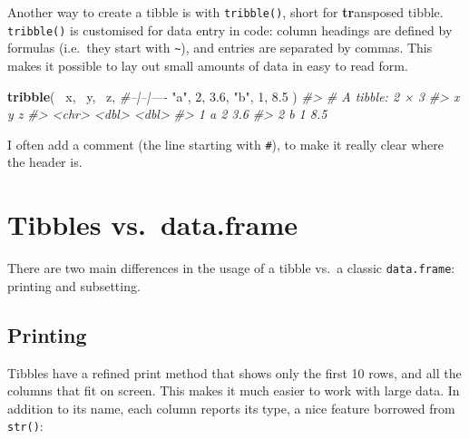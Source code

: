 \documentclass[]{book}
\newenvironment{Shaded}{\begin{snugshade}}{\end{snugshade}}
\newcommand{\KeywordTok}[1]{\textcolor[rgb]{0.13,0.29,0.53}{\textbf{{#1}}}}
\newcommand{\DecValTok}[1]{\textcolor[rgb]{0.00,0.00,0.81}{{#1}}}
\newcommand{\FloatTok}[1]{\textcolor[rgb]{0.00,0.00,0.81}{{#1}}}
\newcommand{\StringTok}[1]{\textcolor[rgb]{0.31,0.60,0.02}{{#1}}}
\newcommand{\CommentTok}[1]{\textcolor[rgb]{0.56,0.35,0.01}{\textit{{#1}}}}
\newcommand{\NormalTok}[1]{{#1}}
\begin{document}
Another way to create a tibble is with \texttt{tribble()}, short for
\textbf{tr}ansposed tibble. \texttt{tribble()} is customised for data
entry in code: column headings are defined by formulas (i.e.~they start
with \texttt{\textasciitilde{}}), and entries are separated by commas.
This makes it possible to lay out small amounts of data in easy to read
form.

\begin{Shaded}
\begin{Highlighting}[]
\KeywordTok{tribble}\NormalTok{(}
  \NormalTok{~x, ~y, ~z,}
  \CommentTok{#--|--|----}
  \StringTok{"a"}\NormalTok{, }\DecValTok{2}\NormalTok{, }\FloatTok{3.6}\NormalTok{,}
  \StringTok{"b"}\NormalTok{, }\DecValTok{1}\NormalTok{, }\FloatTok{8.5}
\NormalTok{)}
\CommentTok{#> # A tibble: 2 × 3}
\CommentTok{#>       x     y     z}
\CommentTok{#>   <chr> <dbl> <dbl>}
\CommentTok{#> 1     a     2   3.6}
\CommentTok{#> 2     b     1   8.5}
\end{Highlighting}
\end{Shaded}

I often add a comment (the line starting with \texttt{\#}), to make it
really clear where the header is.

\section{Tibbles vs.~data.frame}\label{tibbles-vs.data.frame}

There are two main differences in the usage of a tibble vs.~a classic
\texttt{data.frame}: printing and subsetting.

\subsection{Printing}\label{printing}

Tibbles have a refined print method that shows only the first 10 rows,
and all the columns that fit on screen. This makes it much easier to
work with large data. In addition to its name, each column reports its
type, a nice feature borrowed from \texttt{str()}:
\end{document}
